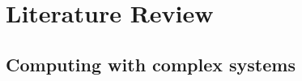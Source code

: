 \chapter{Literature Review}
\label{cha:literature-review}

\section{Computing with complex systems}
